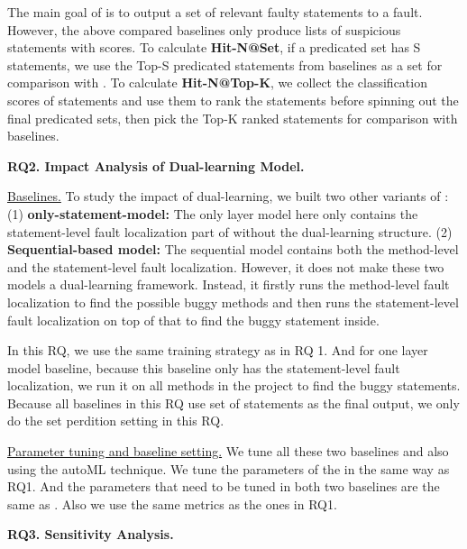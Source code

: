 The main goal of {\tool} is to output a set of relevant faulty statements to a fault. However, the above compared baselines only produce lists of suspicious statements with scores. 
To calculate \textbf{Hit-N@Set}, if a predicated set has S statements, we use the Top-S predicated statements from baselines as a set for comparison with {\tool}. To calculate {\bf Hit-N@Top-K}, we collect the classification scores of statements and use them to rank the statements before spinning out the final predicated sets, then pick the Top-K ranked statements for comparison with baselines.



{\bf RQ2. Impact Analysis of Dual-learning Model.}

\underline{Baselines.} To study the impact of dual-learning, we built two other variants of {\tool}: (1) \textbf{only-statement-model:} The only layer model here only contains the statement-level fault localization part of \tool without the dual-learning structure. (2) \textbf{Sequential-based model:} The sequential model contains both the method-level and the statement-level fault localization. However, it does not make these two models a dual-learning framework. Instead, it firstly runs the method-level fault localization to find the possible buggy methods and then runs the statement-level fault localization on top of that to find the buggy statement inside.

In this RQ, we use the same training strategy as in RQ 1. And for one layer model baseline, because this baseline only has the statement-level fault localization, we run it on all methods in the project to find the buggy statements. Because all baselines in this RQ use set of statements as the final output, we only do the set perdition setting in this RQ.

\underline{ Parameter tuning and baseline setting.} We tune all these two baselines and \tool also using the autoML technique. We tune the parameters of the \tool in the same way as RQ1. And the parameters that need to be tuned in both two baselines are the same as \tool. Also we use the same metrics as the ones in RQ1.

{\bf RQ3. Sensitivity Analysis.}

